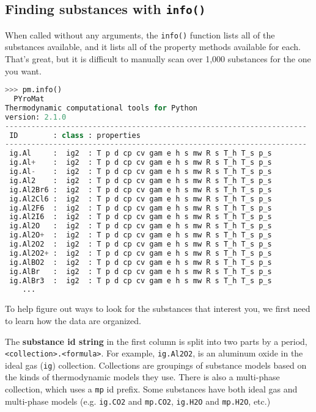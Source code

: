 \subsection{Finding substances with \texttt{info()}}

When called without any arguments, the \texttt{info()} function lists all of the substances available, and it lists all of the property methods available for each.  That's great, but it is difficult to manually scan over 1,000 substances for the one you want.
\begin{lstlisting}[language=Python,style=tinystyle]
>>> pm.info()
  PYroMat
Thermodynamic computational tools for Python
version: 2.1.0
---------------------------------------------------------------------
 ID        : class : properties
---------------------------------------------------------------------
 ig.Al     :  ig2  : T p d cp cv gam e h s mw R s T_h T_s p_s        
 ig.Al+    :  ig2  : T p d cp cv gam e h s mw R s T_h T_s p_s        
 ig.Al-    :  ig2  : T p d cp cv gam e h s mw R s T_h T_s p_s        
 ig.Al2    :  ig2  : T p d cp cv gam e h s mw R s T_h T_s p_s        
 ig.Al2Br6 :  ig2  : T p d cp cv gam e h s mw R s T_h T_s p_s        
 ig.Al2Cl6 :  ig2  : T p d cp cv gam e h s mw R s T_h T_s p_s        
 ig.Al2F6  :  ig2  : T p d cp cv gam e h s mw R s T_h T_s p_s        
 ig.Al2I6  :  ig2  : T p d cp cv gam e h s mw R s T_h T_s p_s        
 ig.Al2O   :  ig2  : T p d cp cv gam e h s mw R s T_h T_s p_s        
 ig.Al2O+  :  ig2  : T p d cp cv gam e h s mw R s T_h T_s p_s        
 ig.Al2O2  :  ig2  : T p d cp cv gam e h s mw R s T_h T_s p_s        
 ig.Al2O2+ :  ig2  : T p d cp cv gam e h s mw R s T_h T_s p_s        
 ig.AlBO2  :  ig2  : T p d cp cv gam e h s mw R s T_h T_s p_s        
 ig.AlBr   :  ig2  : T p d cp cv gam e h s mw R s T_h T_s p_s        
 ig.AlBr3  :  ig2  : T p d cp cv gam e h s mw R s T_h T_s p_s      
    ...
\end{lstlisting}

To help figure out ways to look for the substances that interest you, we first need to learn how the data are organized.

The {\bf substance id string} in the first column is split into two parts by a period, \verb|<collection>.<formula>|.  For example, \verb|ig.Al2O2|, is an aluminum oxide in the ideal gas (\verb|ig|) collection.  Collections are groupings of substance models based on the kinds of thermodynamic models they use.  There is also a multi-phase collection, which uses a \texttt{mp} id prefix.  Some substances have both ideal gas and multi-phase models (e.g. \texttt{ig.CO2} and \texttt{mp.CO2}, \texttt{ig.H2O} and \texttt{mp.H2O}, etc.)

